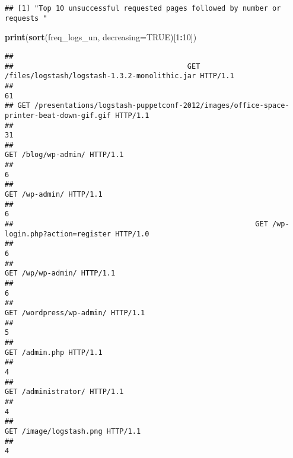 \documentclass[]{article}
\newenvironment{Shaded}{\begin{snugshade}}{\end{snugshade}}
\newcommand{\DataTypeTok}[1]{\textcolor[rgb]{0.13,0.29,0.53}{#1}}
\newcommand{\DecValTok}[1]{\textcolor[rgb]{0.00,0.00,0.81}{#1}}
\newcommand{\KeywordTok}[1]{\textcolor[rgb]{0.13,0.29,0.53}{\textbf{#1}}}
\newcommand{\NormalTok}[1]{#1}
\newcommand{\OperatorTok}[1]{\textcolor[rgb]{0.81,0.36,0.00}{\textbf{#1}}}
\newcommand{\OtherTok}[1]{\textcolor[rgb]{0.56,0.35,0.01}{#1}}
\begin{document}
\begin{verbatim}
## [1] "Top 10 unsuccessful requested pages followed by number or requests "
\end{verbatim}

\begin{Shaded}
\begin{Highlighting}[]
\KeywordTok{print}\NormalTok{(}\KeywordTok{sort}\NormalTok{(freq_logs_un, }\DataTypeTok{decreasing=}\OtherTok{TRUE}\NormalTok{)[}\DecValTok{1}\OperatorTok{:}\DecValTok{10}\NormalTok{])}
\end{Highlighting}
\end{Shaded}

\begin{verbatim}
## 
##                                         GET /files/logstash/logstash-1.3.2-monolithic.jar HTTP/1.1 
##                                                                                                 61 
## GET /presentations/logstash-puppetconf-2012/images/office-space-printer-beat-down-gif.gif HTTP/1.1 
##                                                                                                 31 
##                                                                       GET /blog/wp-admin/ HTTP/1.1 
##                                                                                                  6 
##                                                                            GET /wp-admin/ HTTP/1.1 
##                                                                                                  6 
##                                                         GET /wp-login.php?action=register HTTP/1.0 
##                                                                                                  6 
##                                                                         GET /wp/wp-admin/ HTTP/1.1 
##                                                                                                  6 
##                                                                  GET /wordpress/wp-admin/ HTTP/1.1 
##                                                                                                  5 
##                                                                            GET /admin.php HTTP/1.1 
##                                                                                                  4 
##                                                                       GET /administrator/ HTTP/1.1 
##                                                                                                  4 
##                                                                   GET /image/logstash.png HTTP/1.1 
##                                                                                                  4
\end{verbatim}
\end{document}

